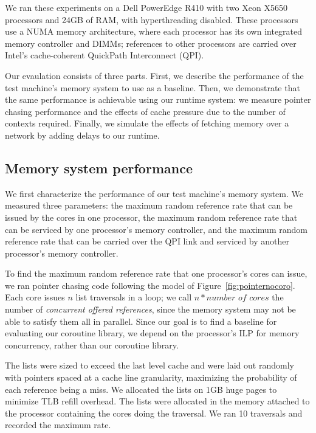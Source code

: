 \documentclass{acm_proc_article-sp}
\begin{document}
We ran these experiments on a Dell PowerEdge R410 with two Xeon X5650
processors and 24GB of RAM, with hyperthreading disabled. These
processors use a NUMA memory architecture, where each processor has
its own integrated memory controller and DIMMs; references to other
processors are carried over Intel's cache-coherent QuickPath
Interconnect (QPI).

Our evaulation consists of three parts. First, we describe the
performance of the test machine's memory system to use as a
baseline. Then, we demonstrate that the same performance is achievable
using our runtime system: we measure pointer chasing performance and
the effects of cache pressure due to the number of contexts
required. Finally, we simulate the effects of fetching memory over a
network by adding delays to our runtime.

\subsection{Memory system performance}

We first characterize the performance of our test machine's memory
system. We measured three parameters: the maximum random reference
rate that can be issued by the cores in one processor, the maximum random
reference rate that can be serviced by one processor's memory controller,
and the maximum random reference rate that can be carried over the QPI
link and serviced by another processor's memory controller.

To find the maximum random reference rate that one processor's cores
can issue, we ran pointer chasing code following the model of
Figure~\ref{fig:pointernocoro}. Each core issues $n$ list traversals
in a loop; we call $n * \textit{number of cores}$ the number of
{\em concurrent offered references}, since the memory system may not
be able to satisfy them all in parallel. Since our goal is to find a
baseline for evaluating our coroutine library, we depend on the
processor's ILP for memory concurrency, rather than our coroutine
library.

The lists were sized to exceed the last level cache and were laid out
randomly with pointers spaced at a cache line granularity, maximizing
the probability of each reference being a miss. We allocated the lists
on 1GB huge pages to minimize TLB refill overhead. The lists were
allocated in the memory attached to the processor containing the cores
doing the traversal. We ran 10 traversals and recorded the maximum
rate.
\end{document}
